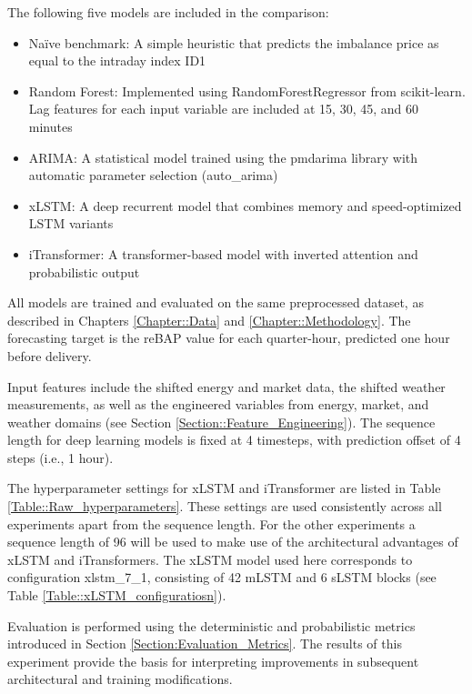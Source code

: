 \documentclass[class=scrbook, crop=false]{standalone}
\begin{document}
The following five models are included in the comparison:
\begin{itemize}
\item Naïve benchmark: A simple heuristic that predicts the imbalance price as equal to the intraday index ID1
\item Random Forest: Implemented using RandomForestRegressor from scikit-learn. Lag features for each input variable are included at 15, 30, 45, and 60 minutes
\item ARIMA: A statistical model trained using the pmdarima library with automatic parameter selection (auto\_arima)
\item xLSTM: A deep recurrent model that combines memory and speed-optimized LSTM variants
\item iTransformer: A transformer-based model with inverted attention and probabilistic output
\end{itemize}

All models are trained and evaluated on the same preprocessed dataset, as described in Chapters \ref{Chapter::Data} and \ref{Chapter::Methodology}. The forecasting target is the reBAP value for each quarter-hour, predicted one hour before delivery.

Input features include the shifted energy and market data, the shifted weather measurements, as well as the engineered variables from energy, market, and weather domains (see Section \ref{Section::Feature_Engineering}). The sequence length for deep learning models is fixed at 4 timesteps, with prediction offset of 4 steps (i.e., 1 hour).

The hyperparameter settings for xLSTM and iTransformer are listed in Table \ref{Table::Raw_hyperparameters}. These settings are used consistently across all experiments apart from the sequence length. For the other experiments a sequence length of 96 will be used to make use of the architectural advantages of xLSTM and iTransformers. The xLSTM model used here corresponds to configuration xlstm\_7\_1, consisting of 42 mLSTM and 6 sLSTM blocks (see Table \ref{Table::xLSTM_configuratiosn}). 

Evaluation is performed using the deterministic and probabilistic metrics introduced in Section \ref{Section:Evaluation_Metrics}. The results of this experiment provide the basis for interpreting improvements in subsequent architectural and training modifications.

\end{document}
